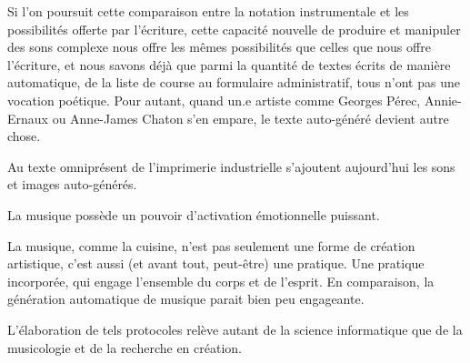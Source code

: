 Si l'on poursuit cette comparaison entre la notation instrumentale et les possibilités offerte par l'écriture, cette capacité nouvelle de produire et manipuler des sons complexe nous offre les mêmes possibilités que celles que nous offre l'écriture, et nous savons déjà que parmi la quantité de textes écrits de manière automatique, de la liste de course au formulaire administratif, tous n'ont pas une vocation poétique. Pour autant, quand un.e artiste comme Georges Pérec, Annie-Ernaux ou Anne-James Chaton s'en empare, le texte auto-généré devient autre chose.

Au texte omniprésent de l'imprimerie industrielle s'ajoutent aujourd'hui les sons et images auto-générés.

La musique possède un pouvoir d'activation émotionnelle puissant.

La musique, comme la cuisine, n'est pas seulement une forme de création artistique, c'est aussi (et avant tout, peut-être) une pratique. Une pratique incorporée, qui engage l'ensemble du corps et de l'esprit. En comparaison, la génération automatique de musique parait bien peu engageante.





L'élaboration de tels protocoles relève autant de la science informatique que de la musicologie et de la recherche en création.



